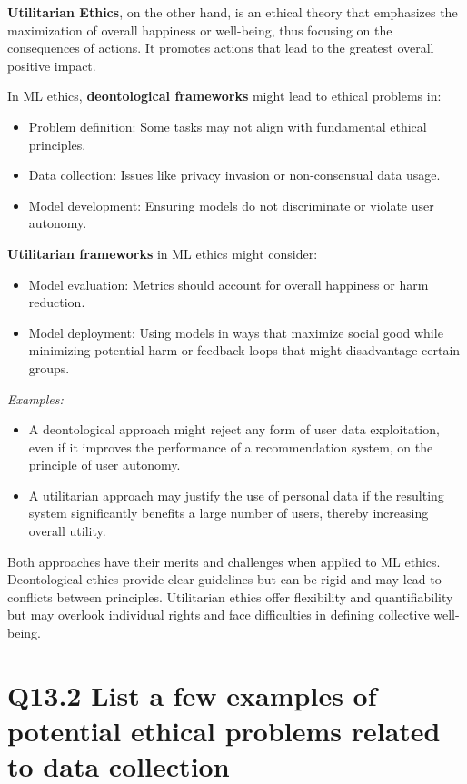 \documentclass[11pt]{article}
\begin{document}
\textbf{Utilitarian Ethics}, on the other hand, is an ethical theory that emphasizes the maximization of overall happiness or well-being, thus focusing on the consequences of actions. It promotes actions that lead to the greatest overall positive impact.

In ML ethics, \textbf{deontological frameworks} might lead to ethical problems in:
\begin{itemize}
    \item Problem definition: Some tasks may not align with fundamental ethical principles.
    \item Data collection: Issues like privacy invasion or non-consensual data usage.
    \item Model development: Ensuring models do not discriminate or violate user autonomy.
\end{itemize}

\textbf{Utilitarian frameworks} in ML ethics might consider:
\begin{itemize}
    \item Model evaluation: Metrics should account for overall happiness or harm reduction.
    \item Model deployment: Using models in ways that maximize social good while minimizing potential harm or feedback loops that might disadvantage certain groups.
\end{itemize}

\textit{Examples:}
\begin{itemize}
    \item A deontological approach might reject any form of user data exploitation, even if it improves the performance of a recommendation system, on the principle of user autonomy.
    \item A utilitarian approach may justify the use of personal data if the resulting system significantly benefits a large number of users, thereby increasing overall utility.
\end{itemize}

Both approaches have their merits and challenges when applied to ML ethics. Deontological ethics provide clear guidelines but can be rigid and may lead to conflicts between principles. Utilitarian ethics offer flexibility and quantifiability but may overlook individual rights and face difficulties in defining collective well-being.

\section{Q13.2 List a few examples of potential ethical problems related to data collection}
\end{document}
